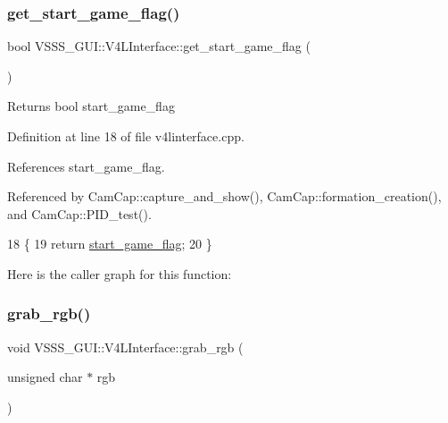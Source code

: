 \subsubsection{\texorpdfstring{get\+\_\+start\+\_\+game\+\_\+flag()}{get\_start\_game\_flag()}}
{\footnotesize\ttfamily bool V\+S\+S\+S\+\_\+\+G\+U\+I\+::\+V4\+L\+Interface\+::get\+\_\+start\+\_\+game\+\_\+flag (\begin{DoxyParamCaption}{ }\end{DoxyParamCaption})}

\begin{DoxyReturn}{Returns}
bool start\+\_\+game\+\_\+flag 
\end{DoxyReturn}


Definition at line 18 of file v4linterface.\+cpp.



References start\+\_\+game\+\_\+flag.



Referenced by Cam\+Cap\+::capture\+\_\+and\+\_\+show(), Cam\+Cap\+::formation\+\_\+creation(), and Cam\+Cap\+::\+P\+I\+D\+\_\+test().


\begin{DoxyCode}
18                                           \{
19         \textcolor{keywordflow}{return} \hyperlink{class_v_s_s_s___g_u_i_1_1_v4_l_interface_a864e480f734ddf62c070dd0f4593a484}{start\_game\_flag};
20     \}
\end{DoxyCode}
Here is the caller graph for this function\+:
\mbox{\label{class_v_s_s_s___g_u_i_1_1_v4_l_interface_a4253d7fbc31e63ce398d47317baaf3a5}} 
\subsubsection{\texorpdfstring{grab\+\_\+rgb()}{grab\_rgb()}}
{\footnotesize\ttfamily void V\+S\+S\+S\+\_\+\+G\+U\+I\+::\+V4\+L\+Interface\+::grab\+\_\+rgb (\begin{DoxyParamCaption}\item[{unsigned char $\ast$}]{rgb }\end{DoxyParamCaption})}




